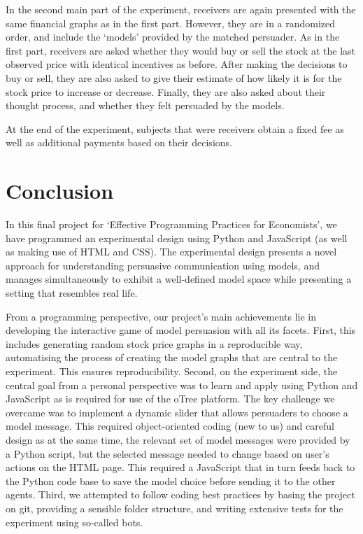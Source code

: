 \documentclass[11pt, a4paper, leqno]{article}
\begin{document}
In the second main part of the experiment, receivers are again presented with the same financial graphs as in the first part. However, they are in a randomized order, and include the `models' provided by the matched persuader. As in the first part, receivers are asked whether they would buy or sell the stock at the last observed price with identical incentives as before. After making the decisions to buy or sell, they are also asked to give their estimate of how likely it is for the stock price to increase or decrease. Finally, they are also asked about their thought process, and whether they felt persuaded by the models.

At the end of the experiment, subjects that were receivers obtain a fixed fee as well as additional payments based on their decisions.



\section{Conclusion}

In this final project for `Effective Programming Practices for Economists', we have programmed an experimental design using Python and JavaScript (as well as making use of HTML and CSS). The experimental design presents a novel approach for understanding persuasive communication using models, and manages simultaneously to exhibit a well-defined model space while presenting a setting that resembles real life.

From a programming perspective, our project's main achievements lie in developing the interactive game of model persuasion with all its facets. First, this includes generating random stock price graphs in a reproducible way, automatising the process of creating the model graphs that are central to the experiment. This ensures reproducibility. Second, on the experiment side, the central goal from a personal perspective was to learn and apply using Python and JavaScript as is required for use of the oTree platform. The key challenge we overcame was to implement a dynamic slider that allows persuaders to choose a model message. This required object-oriented coding (new to us) and careful design as at the same time, the relevant set of model messages were provided by a Python script, but the selected message needed to change based on user's actions on the HTML page. This required a JavaScript that in turn feeds back to the Python code base to save the model choice before sending it to the other agents.
Third, we attempted to follow coding best practices by basing the project on git, providing a sensible folder structure, and writing extensive tests for the experiment using so-called bots.
\end{document}
